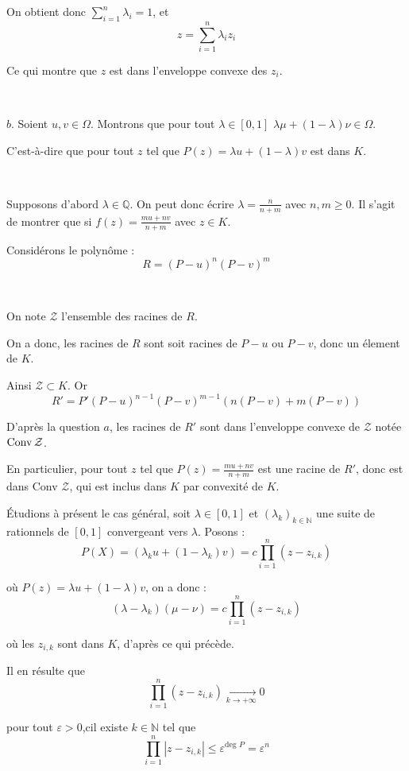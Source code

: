 On obtient donc $\sum_{i = 1}^n \lambda_i = 1$, et
\[ z = \sum_{i = 1}^n \lambda_i z_i \]


Ce qui montre que $z$ est dans l'enveloppe convexe des $z_i$.

\

$b.$ Soient $u, v \in \Omega$. Montrons que pour tout $\lambda \in [0, 1]$
$\lambda \mu + (1 - \lambda) \nu \in \Omega$.

C'est-{\`a}-dire que pour tout $z$ tel que $P (z) = \lambda u + (1 - \lambda)
v$ est dans $K$.

\

Supposons d'abord $\lambda \in \mathbb{Q}$. On peut donc {\'e}crire $\lambda
= \frac{n}{n + m}$ avec $n, m \geq 0$. Il s'agit de montrer que si $f (z) =
\frac{mu + nv}{n + m}$ avec $z \in K$.

Consid{\'e}rons le polyn{\^o}me :
\[ R = (P - u)^n (P - v)^m \]


\

On note $\mathcal{Z}$ l'ensemble des racines de $R$.

On a donc, les racines de $R$ sont soit racines de $P - u$ ou $P - v$, donc
un {\'e}lement de $K$.

Ainsi $\mathcal{Z} \subset K$. Or
\[ R' = P' (P - u)^{n - 1} (P - v)^{m - 1} (n (P - v) + m (P - v)) \]


D'apr{\`e}s la question $a$, les racines de $R'$ sont dans l'enveloppe convexe
de $\mathcal{Z}$ not{\'e}e $\operatorname{Conv} \mathcal{Z}$.

En particulier, pour tout $z$ tel que $P (z) = \frac{mu + nv}{n + m}$ est une
racine de $R'$, donc est dans Conv $\mathcal{Z}$, qui est inclus dans $K$ par
convexit{\'e} de $K$.

{\'E}tudions {\`a} pr{\'e}sent le cas g{\'e}n{\'e}ral, soit $\lambda \in [0,
1]$ et $(\lambda_k)_{k \in \mathbb{N}}$ une suite de rationnels de $[0, 1]$
convergeant vers $\lambda$. Posons :
\[ P (X) = (\lambda_k u + (1 - \lambda_k) v) = c \prod_{i = 1}^n (z - z_{i,
   k}) \]


o{\`u} $P (z) = \lambda u + (1 - \lambda) v$, on a donc :
\[ (\lambda - \lambda_k) (\mu - \nu) = c \prod_{i = 1}^n (z - z_{i, k}) \]


o{\`u} les $z_{i, k}$ sont dans $K$, d'apr{\`e}s ce qui pr{\'e}c{\`e}de.

Il en r{\'e}sulte que
\[ \prod_{i = 1}^n (z - z_{i, k}) \xrightarrow[k \to + \infty]{} 0 \]


pour tout $\varepsilon > 0$,cil existe $k \in \mathbb{N}$ tel que
\[ \prod_{i = 1}^n |z - z_{i, k} | \leq \varepsilon^{\text{deg } P} =
   \varepsilon^n \]


